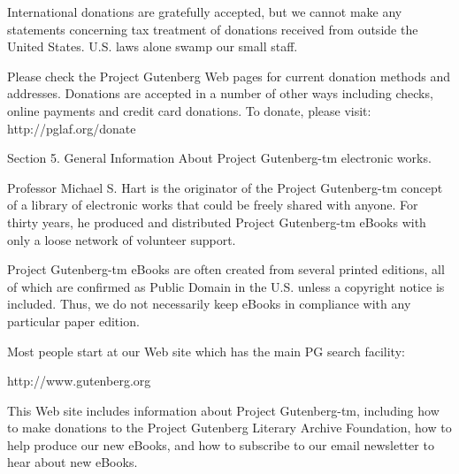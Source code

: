 International donations are gratefully accepted, but we cannot make
any statements concerning tax treatment of donations received from
outside the United States.  U.S. laws alone swamp our small staff.

Please check the Project Gutenberg Web pages for current donation
methods and addresses.  Donations are accepted in a number of other
ways including checks, online payments and credit card donations.
To donate, please visit: http://pglaf.org/donate


Section 5.  General Information About Project Gutenberg-tm electronic
works.

Professor Michael S. Hart is the originator of the Project Gutenberg-tm
concept of a library of electronic works that could be freely shared
with anyone.  For thirty years, he produced and distributed Project
Gutenberg-tm eBooks with only a loose network of volunteer support.


Project Gutenberg-tm eBooks are often created from several printed
editions, all of which are confirmed as Public Domain in the U.S.
unless a copyright notice is included.  Thus, we do not necessarily
keep eBooks in compliance with any particular paper edition.


Most people start at our Web site which has the main PG search facility:

     http://www.gutenberg.org

This Web site includes information about Project Gutenberg-tm,
including how to make donations to the Project Gutenberg Literary
Archive Foundation, how to help produce our new eBooks, and how to
subscribe to our email newsletter to hear about new eBooks.
